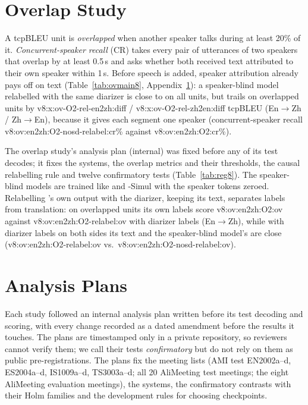 \section{Overlap Study}
\label{app:v8}
\label{sec:eval-overlap}

A tcpBLEU unit is \emph{overlapped} when another speaker talks during at least 20\% of it. \emph{Concurrent-speaker
recall} (CR) takes every pair of utterances of two speakers that overlap by at least 0.5\,s and asks whether both
received text attributed to their own speaker within 1\,s. Before speech is added, speaker attribution already pays off on text (Table~\ref{tab:ovmain8}, Appendix~\ref{app:v8}):
a speaker-blind model relabelled with the same diarizer is close to \sys{} on all units, but trails on overlapped units by
\num{v8:x:ov-O2-rel-en2zh:diff} / \num{v8:x:ov-O2-rel-zh2en:diff} tcpBLEU (En$\rightarrow$Zh / Zh$\rightarrow$En),
because it gives each segment one speaker (concurrent-speaker recall \num{v8:ov:en2zh:O2-nosd-relabel:cr}\% against
\num{v8:ov:en2zh:O2:cr}\%).


The overlap study's analysis plan (internal) was fixed before any of its test decodes; it fixes the systems, the overlap
metrics and their thresholds, the causal relabelling rule and twelve confirmatory tests (Table~\ref{tab:reg8}). The
speaker-blind models are trained like \sys{} and \sys{}-Simul with the speaker tokens zeroed. Relabelling \sys{}'s own
output with the diarizer, keeping its text, separates labels from translation: on overlapped units its own labels score
\num{v8:ov:en2zh:O2:ov} against \num{v8:ov:en2zh:O2-relabel:ov} with diarizer labels (En$\rightarrow$Zh), while with
diarizer labels on both sides its text and the speaker-blind model's are close
(\num{v8:ov:en2zh:O2-relabel:ov} vs.\ \num{v8:ov:en2zh:O2-nosd-relabel:ov}).




\section{Analysis Plans}
\label{app:prereg}

Each study followed an internal analysis plan written before its test decoding and scoring, with every change recorded
as a dated amendment before the results it touches. The plans are timestamped only in a private repository, so
reviewers cannot verify them; we call their tests \emph{confirmatory} but do not rely on them as public
pre-registrations. The plans fix the meeting lists (AMI test EN2002a--d, ES2004a--d, IS1009a--d, TS3003a--d; all 20
AliMeeting test meetings; the eight AliMeeting evaluation meetings), the systems, the confirmatory contrasts with their
Holm families and the development rules for choosing checkpoints.
